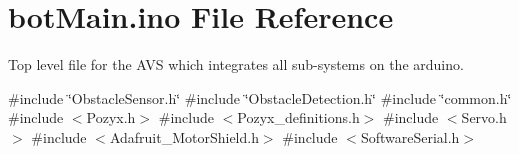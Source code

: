 \hypertarget{bot_main_8ino}{}\section{bot\+Main.\+ino File Reference}
\label{bot_main_8ino}


Top level file for the A\+VS which integrates all sub-\/systems on the arduino.  


{\ttfamily \#include \char`\"{}Obstacle\+Sensor.\+h\char`\"{}}\newline
{\ttfamily \#include \char`\"{}Obstacle\+Detection.\+h\char`\"{}}\newline
{\ttfamily \#include \char`\"{}common.\+h\char`\"{}}\newline
{\ttfamily \#include $<$Pozyx.\+h$>$}\newline
{\ttfamily \#include $<$Pozyx\+\_\+definitions.\+h$>$}\newline
{\ttfamily \#include $<$Servo.\+h$>$}\newline
{\ttfamily \#include $<$Adafruit\+\_\+\+Motor\+Shield.\+h$>$}\newline
{\ttfamily \#include $<$Software\+Serial.\+h$>$}\newline
